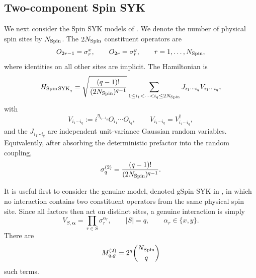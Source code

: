 \documentclass{article}
\theoremstyle{definition}
\begin{document}
\subsection{Two-component Spin SYK}
\label{subsec:two_component_spin_syk_regulator}

We next consider the Spin SYK models of \cite{BasuDasNandy}.  We denote
the number of physical spin sites by $N_{\rm Spin}$.  The
$2N_{\rm Spin}$ constituent operators are
\begin{equation}
    O_{2r-1}=\sigma_r^x,
    \qquad
    O_{2r}=\sigma_r^y,
    \qquad
    r=1,\ldots,N_{\rm Spin},
    \label{eq:BDN_constituent_O}
\end{equation}
where identities on all other sites are implicit.  The Hamiltonian is
\begin{equation}
    H_{{\rm Spin\,SYK}_q}
    =
    \sqrt{
       \frac{(q-1)!}{(2N_{\rm Spin})^{q-1}}
    }
    \sum_{1\leq i_1<\cdots<i_q\leq2N_{\rm Spin}}
    J_{i_1\cdots i_q}
    V_{i_1\cdots i_q},
    \label{eq:BDN_H}
\end{equation}
with
\begin{equation}
    V_{i_1\cdots i_q}
    :=
    i^{\eta_{i_1\cdots i_q}}
    O_{i_1}\cdots O_{i_q},
    \qquad
    V_{i_1\cdots i_q}
    =
    V_{i_1\cdots i_q}^\dagger,
    \label{eq:BDN_VI}
\end{equation}
and the $J_{i_1\cdots i_q}$ are independent unit-variance Gaussian
random variables.  Equivalently, after absorbing the deterministic
prefactor into the random coupling,
\begin{equation}
    \sigma_q^{(2)}
    =
    \frac{(q-1)!}
         {(2N_{\rm Spin})^{q-1}}.
    \label{eq:BDN_sigma}
\end{equation}

It is useful first to consider the genuine model, denoted gSpin-SYK in
\cite{BasuDasNandy}, in which no interaction contains two constituent
operators from the same physical spin site.  Since all factors then act
on distinct sites, a genuine interaction is simply
\begin{equation}
    V_{S,\boldsymbol\alpha}
    =
    \prod_{r\in S}\sigma_r^{\alpha_r},
    \qquad
    |S|=q,
    \qquad
    \alpha_r\in\{x,y\}.
    \label{eq:BDN_genuine_V}
\end{equation}
There are
\begin{equation}
    M_{q,g}^{(2)}
    =
    2^q
    \binom{N_{\rm Spin}}q
    \label{eq:BDN_genuine_number}
\end{equation}
such terms.
\end{document}

